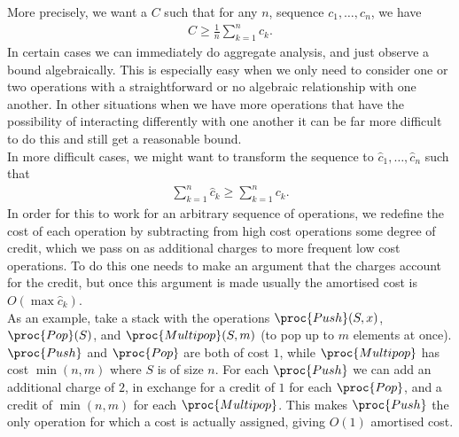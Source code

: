 \documentclass{tikzposter} %
\begin{document}
\begin{columns}
{    More precisely, we want a $C$ such that for any $n$, sequence $c_{1},\dots,c_{n}$, we have
    \begin{align*}
      C \ge \frac{1}{n}\sum_{k=1}^{n} c_{k}.
    \end{align*}
    In certain cases we can immediately do aggregate analysis, and just observe a bound algebraically. This is especially easy when we only need to consider one or two operations with a straightforward or no algebraic relationship with one another. In other situations when we have more operations that have the possibility of interacting differently with one another it can be far more difficult to do this and still get a reasonable bound. \\

    In more difficult cases, we might want to transform the sequence to $\widehat{c}_{1}, \dots, \widehat{c}_{n}$ such that
    \begin{align*}
      \sum_{k=1}^{n} \widehat{c}_{k} \ge \sum_{k=1}^{n} c_{k}.
    \end{align*}
    In order for this to work for an arbitrary sequence of operations, we redefine the cost of each operation by subtracting from high cost operations some degree of credit, which we pass on as additional charges to more frequent low cost operations. To do this one needs to make an argument that the charges account for the credit, but once this argument is made usually the amortised cost is $O(\max \widehat{c}_{k})$. \\

    As an example, take a stack with the operations $\proc{Push}(S,x)$, $\proc{Pop}(S)$, and $\proc{Multipop}(S,m)$ (to pop up to $m$ elements at once). $\proc{Push}$ and $\proc{Pop}$ are both of cost $1$, while $\proc{Multipop}$ has cost $\min(n,m)$ where $S$ is of size $n$. For each $\proc{Push}$ we can add an additional charge of $2$, in exchange for a credit of $1$ for each $\proc{Pop}$, and a credit of $\min(n,m)$ for each $\proc{Multipop}$. This makes $\proc{Push}$ the only operation for which a cost is actually assigned, giving $O(1)$ amortised cost. \\

}
\end{columns}
\end{document}
